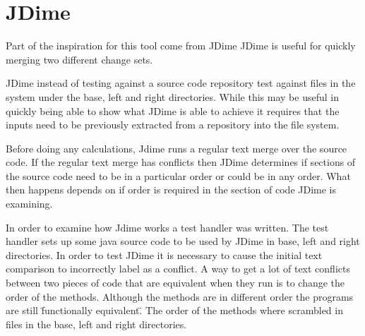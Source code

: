 
\chapter{JDime}
Part of the inspiration for this tool come from JDime
JDime is useful for quickly merging two different change sets. 


JDime instead of testing against a source code repository test against files in the system under the base, left and right directories.
While this may be useful in quickly being able to show what JDime is able to achieve it requires that the inputs need to be previously extracted from a repository into the file system.

Before doing any calculations, Jdime runs a regular text merge over the source code.  
If the regular text merge has conflicts then JDime determines if sections of the source code need to be in a particular order or could be in any order.
What then happens depends on if order is required in the section of code JDime is examining.


In order to examine how Jdime works a test handler was written.
The test handler sets up some java source code to be used by JDime in base, left and right directories.
In order to test JDime it is necessary to cause the initial text comparison to incorrectly label as a conflict.
A way to get a lot of text conflicts between two pieces of code that are equivalent when they run is to change the order of the methods.
Although the methods are in different order the programs are still \"functionally equivalent\".
The order of the methods where scrambled in files in the base, left and right directories.





 







